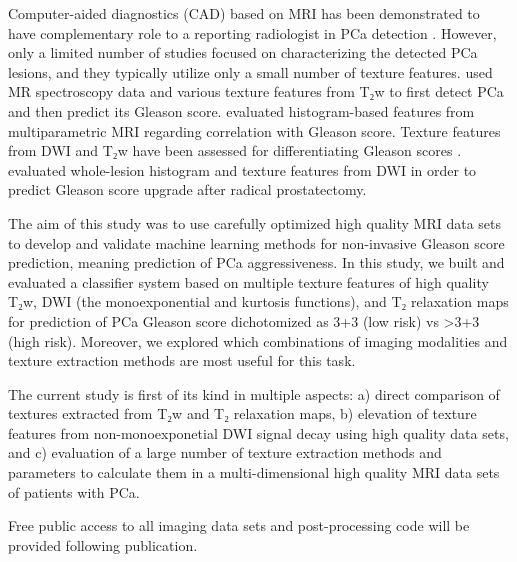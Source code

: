 Computer-aided diagnostics (CAD) based on MRI has been demonstrated to have
complementary role to a reporting radiologist in PCa detection \citep{Kwak2015,
Viswanath2012, Ginsburg2014}. However, only a limited number of studies focused
on characterizing the detected PCa lesions, and they typically utilize only a
small number of texture features. \citet{Tiwari2013} used MR spectroscopy data
and various texture features from T₂w to first detect PCa and then predict its
Gleason score. \citet{Peng2013} evaluated histogram-based features from
multiparametric MRI regarding correlation with Gleason score. Texture features
from DWI and T₂w have been assessed for differentiating Gleason scores
\citep{Wibmer2015, Vignati2015, Fehr2015}. \citet{Rozenberg2016} evaluated
whole-lesion histogram and texture features from DWI in order to predict Gleason
score upgrade after radical prostatectomy.

The aim of this study was to use carefully optimized high quality MRI data sets
to develop and validate machine learning methods for non-invasive Gleason score
prediction, meaning prediction of PCa aggressiveness. In this study, we built
and evaluated a classifier system based on multiple texture features of high
quality T₂w, DWI (the monoexponential and kurtosis functions), and T₂ relaxation
maps for prediction of PCa Gleason score dichotomized as 3+3 (low risk) vs >3+3
(high risk). Moreover, we explored which combinations of imaging modalities and
texture extraction methods are most useful for this task.

The current study is first of its kind in multiple aspects: a) direct comparison
of textures extracted from T₂w and T₂ relaxation maps, b) elevation of texture
features from non-monoexponetial DWI signal decay using high quality data sets,
and c) evaluation of a large number of texture extraction methods and parameters
to calculate them in a multi-dimensional high quality MRI data sets of patients
with PCa.

Free public access to all imaging data sets and post-processing code will be
provided following publication.
